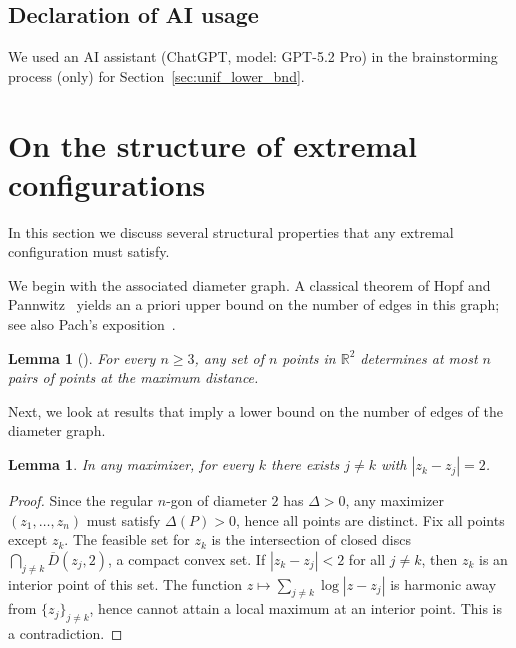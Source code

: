\documentclass{article}
\newtheorem{lem}[thr]{Lemma}
\theoremstyle{definition}
\let\ge\geqslant
\begin{document}
\subsection{Declaration of AI usage}

We used an AI assistant (ChatGPT, model: GPT-5.2 Pro) in the brainstorming process (only) for Section~\ref{sec:unif_lower_bnd}.


\section{On the structure of extremal configurations}\label{sec:diam_graph}



In this section we discuss several structural properties that any extremal configuration must satisfy.



We begin with the associated diameter graph. A classical theorem of Hopf and Pannwitz~\cite{HP33} yields an a priori upper bound on the number of edges in this graph; see also Pach's exposition~\cite[Theorem~2]{Pach2013}.




\begin{lem}[\cite{HP33}]\label{lem:hopf_Pannwitz1}
For every $n\ge 3$, any set of $n$ points in $\mathbb R^2$ determines at most $n$
pairs of points at the maximum distance.
\end{lem}





Next, we look at results that imply a lower bound on the number of edges of the diameter graph.



\begin{lem}\label{lem:degge1}
In any maximizer, for every $k$ there exists $j\ne k$ with $|z_k-z_j|=2$.
\end{lem}

\begin{proof}
Since the regular $n$-gon of diameter $2$ has $\Delta>0$,
any maximizer $(z_1,\dots,z_n)$ must satisfy $\Delta(P)>0$, hence all points are distinct. Fix all points except $z_k$. The feasible set for $z_k$ is the
intersection of closed discs $\bigcap_{j\ne k}\overline D(z_j,2)$, a compact
convex set. 
If $|z_k-z_j|<2$ for all $j\ne k$, then $z_k$ is an interior point of this set. The function $z\mapsto \sum_{j\ne k}\log|z-z_j|$ is
harmonic away from $\{z_j\}_{j\ne k}$, hence cannot attain a local maximum at an interior point. 
This is a contradiction.
\end{proof}
\end{document}

